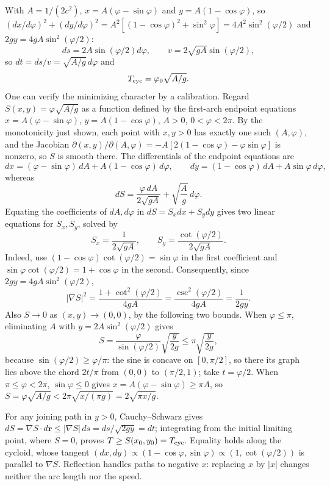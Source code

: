 With $A=1/(2c^2)$, $x=A(\varphi-\sin\varphi)$ and
$y=A(1-\cos\varphi)$, so
$(dx/d\varphi)^2+(dy/d\varphi)^2
=A^2[(1-\cos\varphi)^2+\sin^2\varphi]=4A^2\sin^2(\varphi/2)$
and $2gy=4gA\sin^2(\varphi/2)$:
\[
ds=2A\sin(\varphi/2)d\varphi,\qquad
v=2\sqrt{gA}\sin(\varphi/2),
\]
so $dt=ds/v=\sqrt{A/g}\,d\varphi$ and
\[
T_{\rm cyc}=\varphi_0\sqrt{A/g}.
\]
One can verify the minimizing character by a calibration.
Regard $S(x,y)=\varphi\sqrt{A/g}$ as a function defined by the
first-arch endpoint equations $x=A(\varphi-\sin\varphi)$,
$y=A(1-\cos\varphi)$, $A>0$, $0<\varphi<2\pi$. By the monotonicity
just shown, each point with $x,y>0$ has exactly one such
$(A,\varphi)$, and the Jacobian
$\partial(x,y)/\partial(A,\varphi)
=-A[2(1-\cos\varphi)-\varphi\sin\varphi]$ is nonzero, so $S$ is smooth
there. The differentials of the endpoint equations are
\[
 dx=(\varphi-\sin\varphi)\,dA+A(1-\cos\varphi)\,d\varphi,\qquad
 dy=(1-\cos\varphi)\,dA+A\sin\varphi\,d\varphi,
\]
whereas
\[
dS=\frac{\varphi\,dA}{2\sqrt{gA}}+\sqrt{\frac Ag}\,d\varphi.
\]
Equating the coefficients of $dA,d\varphi$ in $dS=S_xdx+S_ydy$ gives
two linear equations for $S_x,S_y$, solved by
\[
S_x=\frac1{2\sqrt{gA}},\qquad
S_y=\frac{\cot(\varphi/2)}{2\sqrt{gA}}.
\]
Indeed, use $(1-\cos\varphi)\cot(\varphi/2)=\sin\varphi$ in the first
coefficient and $\sin\varphi\cot(\varphi/2)=1+\cos\varphi$ in the
second. Consequently, since $2gy=4gA\sin^2(\varphi/2)$,
\[
|\nabla S|^2=\frac{1+\cot^2(\varphi/2)}{4gA}
=\frac{\csc^2(\varphi/2)}{4gA}=\frac1{2gy}.
\]
Also $S\to0$ as $(x,y)\to(0,0)$, by the following two bounds. When
$\varphi\le\pi$, eliminating $A$ with $y=2A\sin^2(\varphi/2)$ gives
\[
S=\frac{\varphi}{\sin(\varphi/2)}\sqrt{\frac y{2g}}
\le\pi\sqrt{\frac y{2g}},
\]
because $\sin(\varphi/2)\ge\varphi/\pi$: the sine is concave on
$[0,\pi/2]$, so there its graph lies above the chord $2t/\pi$ from
$(0,0)$ to $(\pi/2,1)$; take $t=\varphi/2$. When $\pi\le\varphi<2\pi$, $\sin\varphi\le0$ gives
$x=A(\varphi-\sin\varphi)\ge\pi A$, so
$S=\varphi\sqrt{A/g}<2\pi\sqrt{x/(\pi g)}=2\sqrt{\pi x/g}$.

For any joining path in $y>0$, Cauchy--Schwarz gives
$dS=\nabla S\cdot d\mathbf r\le|\nabla S|\,ds=ds/\sqrt{2gy}=dt$;
integrating from the initial limiting point, where $S=0$, proves
$T\ge S(x_0,y_0)=T_{\rm cyc}$. Equality holds along the cycloid, whose
tangent $(dx,dy)\propto(1-\cos\varphi,\sin\varphi)
\propto(1,\cot(\varphi/2))$ is parallel to $\nabla S$.
Reflection handles paths to negative $x$: replacing $x$ by $|x|$
changes neither the arc length nor the speed.

